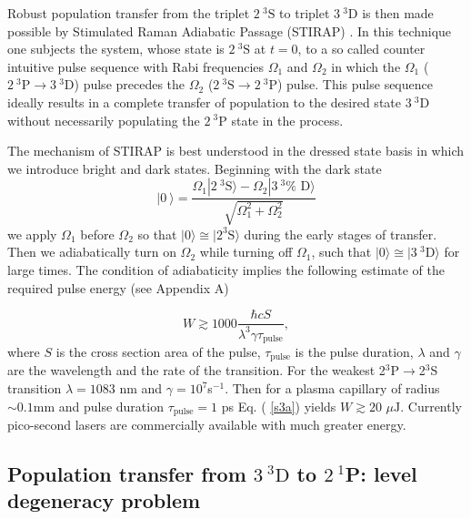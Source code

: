 Robust population transfer from the triplet $2~^{3}\text{S}$ to triplet $%
3~^{3}\text{D}$ is then made possible by Stimulated Raman Adiabatic Passage
(STIRAP) \cite{Berg98}. In this technique one subjects the system, whose
state is $2~^{3}\text{S}$ at $t=0$, to a so called counter intuitive pulse
sequence with Rabi frequencies $\Omega _{1}$ and $\Omega _{2}$ in which the $%
\Omega _{1}$ ($2~^{3}\text{P}\rightarrow 3~^{3}\text{D}$) pulse precedes the
$\Omega _{2}$ ($2~^{3}\text{S}\rightarrow 2~^{3}\text{P}$) pulse. This pulse
sequence ideally results in a complete transfer of population to the desired
state $3~^{3}\text{D}$ without necessarily populating the $2~^{3}\text{P}$
state in the process.

The mechanism of STIRAP is best understood in the dressed state basis in
which we introduce bright and dark states. Beginning with the dark state
\begin{equation}
  |0~\rangle =\frac{\Omega _{1}|2~^{3}\text{S}\rangle -\Omega _{2}|3~^{3}\text{%
      D}\rangle }{\sqrt{\Omega _{1}^{2}+\Omega _{2}^{2}}}
\end{equation}%
we apply $\Omega _{1}$ before $\Omega _{2}$ so that $|0\rangle \cong |2^{3}%
\text{S}\rangle $ during the early stages of transfer. Then we adiabatically
turn on $\Omega _{2}$ while turning off $\Omega _{1}$, such that $|0\rangle
\cong |3~^{3}\text{D}\rangle $ for large times. The condition of
adiabaticity implies the following estimate of the required pulse energy
(see Appendix A)

\begin{equation}
  W\gtrsim 1000\frac{\hbar cS}{\lambda ^{3}\gamma \tau _{\text{pulse}}},
  \label{s3a}
\end{equation}%
where $S$ is the cross section area of the pulse, $\tau _{\text{pulse}}$ is
the pulse duration, $\lambda $ and $\gamma $ are the wavelength and the rate
of the transition. For the weakest 2$^{3}$P$\rightarrow $2$^{3}$S transition
$\lambda =1083$ nm and $\gamma =10^{7}$s$^{-1}$. Then for a plasma capillary
of radius $\sim 0.1$mm and pulse duration $\tau _{\text{pulse}}=1$ ps Eq. (%
\ref{s3a}) yields $W\gtrsim 20$ $\mu \text{J}$. Currently pico-second lasers
are commercially available with much greater energy.

\subsection{Population transfer from $3~^{3}\text{D}$ to $2~^{1}$P: level degeneracy problem}

